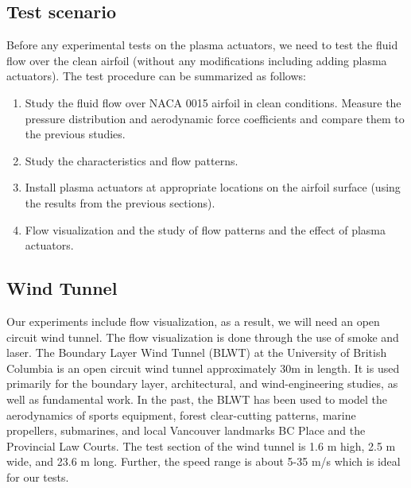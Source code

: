 \documentclass[fleqn,10pt]{SelfArx} %
\begin{document}
\subsection{Test scenario}
Before any experimental tests on the plasma actuators, we need to test the fluid flow over the clean airfoil (without any modifications including adding plasma actuators). The test procedure can be summarized as follows:
\begin{enumerate}
\item Study the fluid flow over NACA 0015 airfoil in clean conditions. Measure the pressure distribution and aerodynamic force coefficients and compare them to the previous studies.
\item Study the characteristics and flow patterns.
\item Install plasma actuators at appropriate locations on the airfoil surface (using the results from the previous sections).
\item Flow visualization and the study of flow patterns and the effect of plasma actuators.
\end{enumerate}

\subsection{Wind Tunnel}
Our experiments include flow visualization, as a result, we will need an open circuit wind tunnel. The flow visualization is done through the use of smoke and laser. The Boundary Layer Wind Tunnel (BLWT) at the University of British Columbia is an open circuit wind tunnel approximately 30m in length. It is used primarily for the boundary layer, architectural, and wind-engineering studies, as well as fundamental work. In the past, the BLWT has been used to model the aerodynamics of sports equipment, forest clear-cutting patterns, marine propellers, submarines, and local Vancouver landmarks BC Place and the Provincial Law Courts. The test section of the wind tunnel is 1.6 m high, 2.5 m wide, and 23.6 m long. Further, the speed range is about 5-35 m/s which is ideal for our tests.
\end{document}
